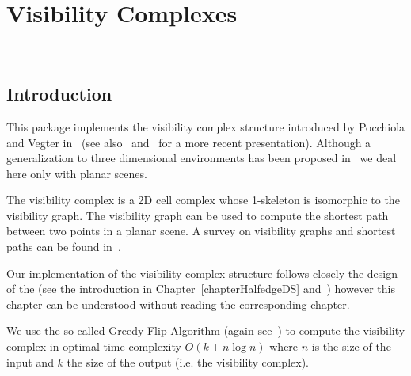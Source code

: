 
\ccParDims

\chapter{Visibility Complexes}
\label{chapterVisibilityComplex}
\\

\minitoc

\section{Introduction}
\label{sectionVComplexIntroduction}
This package implements the visibility complex structure introduced by Pocchiola
and Vegter in~\cite{pv-vc-96} (see also~\cite{pv-tsvcpt-96}
and~\cite{G-ap-sstvc-01} for a more recent presentation). Although a
generalization to three dimensional environments has been proposed
in~\cite{ddp-fahrgv-99} we deal here only with planar scenes. 

The visibility complex is a 2D cell complex whose 1-skeleton is isomorphic to
the visibility graph.  The visibility graph can be used to compute the shortest
path between two points in a planar scene. A survey on visibility graphs and
shortest paths can be found in~\cite{m-gspno-00}.

Our implementation of the visibility complex structure follows closely the
design of the  (see the introduction in
Chapter~\ref{chapterHalfedgeDS} and~\cite{k-ugpdd-99}) however this chapter can
be understood without reading the corresponding chapter.

We use the so-called Greedy Flip Algorithm (again see~\cite{pv-tsvcpt-96}) to
compute the visibility complex in optimal time complexity $O(k + n\log n)$ where
$n$ is the size of the input and $k$ the size of the output (i.e. the visibility
complex).
